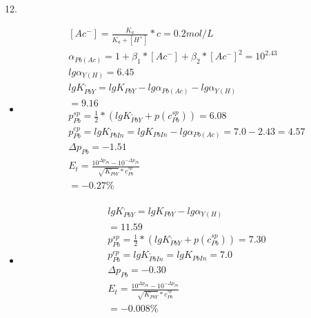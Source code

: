 \documentclass{article}
\begin{document}
12.\begin{itemize}
    \item 
    \begin{equation}
        \begin{multlined}
            [Ac^-] = \frac{K_a}{K_a + [H^+]}* c = 0.2 mol/L\\
            \alpha_{Pb(Ac)} = 1 + \beta_1*[Ac^-] + \beta_2*[Ac^-]^2 = 10^{2.43}\\
            lg\alpha_{Y(H)} = 6.45\\
            lgK^,_{PbY} = lgK_{PbY} - lg\alpha_{Pb(Ac)} - lg\alpha_{Y(H)}\\
            =9.16\\
            p_{Pb}^{sp} = \frac{1}{2}*(lgK^,_{PbY} + p(c_{Pb}^{sp})) = 6.08\\
            p_{Pb}^{ep} = lgK^,_{PbIn} = lgK_{PbIn} - lg \alpha_{Pb(Ac)} = 7.0 - 2.43 = 4.57\\
            \Delta p_{Pb} = -1.51\\
            E_t = \frac{10^{\Delta p_{Pb}}-10^{-\Delta p_{Pb}}}{\sqrt{K^,_{PbY}}*c^{sp}_{Pb}}\\
            = -0.27\%\\
        \end{multlined}
    \end{equation}
    \item
    \begin{equation}
        \begin{multlined}
            lg K^,_{PbY} = lgK_{PbY} - lg\alpha_{Y(H)}\\
            = 11.59\\
            p_{Pb}^{sp} = \frac{1}{2}*(lgK^,_{PbY} + p(c_{Pb}^{sp})) = 7.30\\
            p_{Pb}^{ep} = lgK^,_{PbIn} = lgK_{PbIn} = 7.0\\
            \Delta p_{Pb} = -0.30\\
            E_t = \frac{10^{\Delta p_{Pb}}-10^{-\Delta p_{Pb}}}{\sqrt{K^,_{PbY}}*c^{sp}_{Pb}}\\
            = -0.008\%\\
        \end{multlined}
    \end{equation}
\end{itemize}
\end{document}
